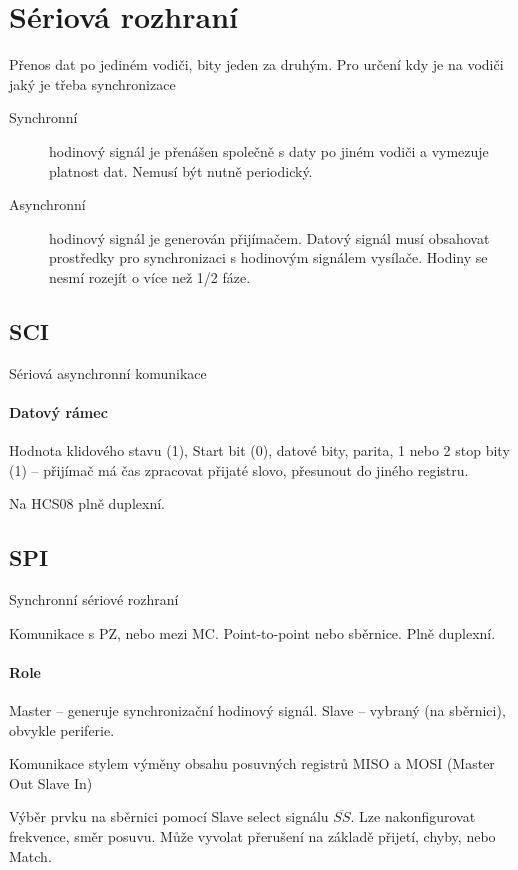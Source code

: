 \documentclass[a4paper, 11pt]{report}
\begin{document}
\section{Sériová rozhraní}

Přenos dat po jediném vodiči, bity jeden za druhým. Pro určení kdy je na vodiči jaký je třeba synchronizace
\begin{description}
	\item[Synchronní] hodinový signál je přenášen společně s daty po jiném vodiči a vymezuje platnost dat. Nemusí být nutně periodický. 
	\item[Asynchronní] hodinový signál je generován přijímačem. Datový signál musí obsahovat prostředky pro synchronizaci s hodinovým signálem vysílače. Hodiny se nesmí rozejít o více než 1/2 fáze.
\end{description}

\subsection{SCI}
Sériová asynchronní komunikace

\paragraph{Datový rámec} Hodnota klidového stavu (1), Start bit (0), datové bity, parita, 1 nebo 2 stop bity (1) -- přijímač má čas zpracovat přijaté slovo, přesunout do jiného registru.

Na HCS08 plně duplexní.

\subsection{SPI}
Synchronní sériové rozhraní

Komunikace s PZ, nebo mezi MC. Point-to-point nebo sběrnice. Plně duplexní.

\paragraph{Role} Master -- generuje synchronizační hodinový signál. Slave -- vybraný (na sběrnici), obvykle periferie.

Komunikace stylem výměny obsahu posuvných registrů MISO a MOSI (Master Out Slave In)

Výběr prvku na sběrnici pomocí Slave select signálu $\overline{SS}$. Lze nakonfigurovat frekvence, směr posuvu. Může vyvolat přerušení na základě přijetí, chyby, nebo Match.
\end{document}
